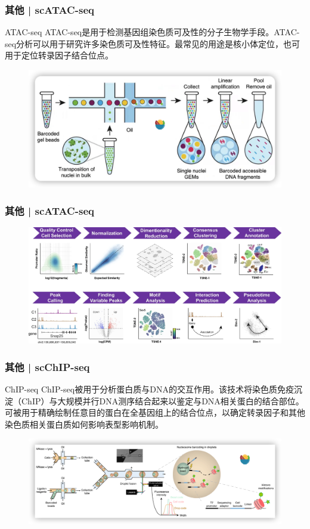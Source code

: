 \documentclass[11pt]{ctexbeamer}
\begin{document}
\begin{frame}
	\frametitle{其他 | scATAC-seq}
	\begin{block}{ATAC-seq}
            ATAC-seq是用于检测基因组染色质可及性的分子生物学手段。ATAC-seq分析可以用于研究许多染色质可及性特征。最常见的用途是核小体定位，也可用于定位转录因子结合位点。
	\end{block}
		\begin{figure}
		\includegraphics[width=\textwidth]{scATAC_01.png}
	\end{figure}
\end{frame}

\begin{frame}
	\frametitle{其他 | scATAC-seq}
	\begin{figure}
		\includegraphics[width=\textwidth]{scATAC_03.png}
	\end{figure}
\end{frame}

\begin{frame}
	\frametitle{其他 | scChIP-seq}
	\begin{block}{ChIP-seq}
		ChIP-seq被用于分析蛋白质与DNA的交互作用。该技术将染色质免疫沉淀（ChIP）与大规模并行DNA测序结合起来以鉴定与DNA相关蛋白的结合部位。可被用于精确绘制任意目的蛋白在全基因组上的结合位点，以确定转录因子和其他染色质相关蛋白质如何影响表型影响机制。
	\end{block}
	\begin{figure}
	\includegraphics[width=\textwidth]{scChIP-seq_01.png}
\end{figure}
\end{frame}
\end{document}
